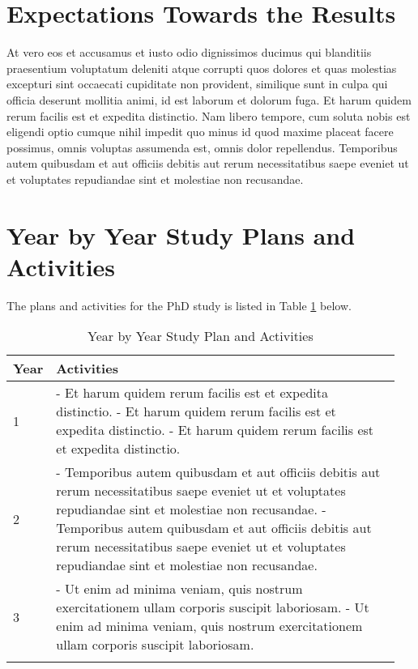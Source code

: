 \documentclass[12pt]{extarticle}
\begin{document}
\section{Expectations Towards the Results}
At vero eos et accusamus et iusto odio dignissimos ducimus qui blanditiis praesentium voluptatum deleniti atque corrupti quos dolores et quas molestias excepturi sint occaecati cupiditate non provident, similique sunt in culpa qui officia deserunt mollitia animi, id est laborum et dolorum fuga. Et harum quidem rerum facilis est et expedita distinctio. Nam libero tempore, cum soluta nobis est eligendi optio cumque nihil impedit quo minus id quod maxime placeat facere possimus, omnis voluptas assumenda est, omnis dolor repellendus. Temporibus autem quibusdam et aut officiis debitis aut rerum necessitatibus saepe eveniet ut et voluptates repudiandae sint et molestiae non recusandae.


\section{Year by Year Study Plans and Activities}
The plans and activities for the PhD study is listed in Table \ref{tab:yearplan} below.

\begin{longtable}[H]{|p{0.05\linewidth}|p{0.9\linewidth}|}
    \hline
    Year & Activities\\
    \hline
   1 & - Et harum quidem rerum facilis est et expedita distinctio.  \newline
   - Et harum quidem rerum facilis est et expedita distinctio. \newline
   - Et harum quidem rerum facilis est et expedita distinctio. \\ 
    \hline
    \hline
   2 & - Temporibus autem quibusdam et aut officiis debitis aut rerum necessitatibus saepe eveniet ut et voluptates repudiandae sint et molestiae non recusandae. \newline
   - Temporibus autem quibusdam et aut officiis debitis aut rerum necessitatibus saepe eveniet ut et voluptates repudiandae sint et molestiae non recusandae.\\ 
    \hline
    \hline
   3 & - Ut enim ad minima veniam, quis nostrum exercitationem ullam corporis suscipit laboriosam. \newline
   - Ut enim ad minima veniam, quis nostrum exercitationem ullam corporis suscipit laboriosam. \\ 
    \hline
    
\caption{Year by Year Study Plan and Activities} \label{tab:yearplan}
\end{longtable}
\end{document}
